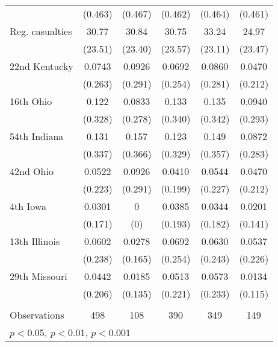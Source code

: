 {\begin{tabular}{lccccc}
 & (0.463) & (0.467) & (0.462) & (0.464) & (0.461) \\
Reg. casualties & 30.77 & 30.84 & 30.75 & 33.24\sym{***} & 24.97\sym{***} \\
 & (23.51) & (23.40) & (23.57) & (23.11) & (23.47) \\
22nd Kentucky & 0.0743 & 0.0926 & 0.0692 & 0.0860\sym{*} & 0.0470\sym{*} \\
 & (0.263) & (0.291) & (0.254) & (0.281) & (0.212) \\
16th Ohio & 0.122 & 0.0833 & 0.133 & 0.135 & 0.0940 \\
 & (0.328) & (0.278) & (0.340) & (0.342) & (0.293) \\
54th Indiana & 0.131 & 0.157 & 0.123 & 0.149\sym{**} & 0.0872\sym{**} \\
 & (0.337) & (0.366) & (0.329) & (0.357) & (0.283) \\
42nd Ohio & 0.0522 & 0.0926\sym{**} & 0.0410\sym{**} & 0.0544 & 0.0470 \\
 & (0.223) & (0.291) & (0.199) & (0.227) & (0.212) \\
4th Iowa & 0.0301\sym{***} & 0\sym{***} & 0.0385 & 0.0344 & 0.0201 \\
 & (0.171) & (0) & (0.193) & (0.182) & (0.141) \\
13th Illinois & 0.0602 & 0.0278\sym{**} & 0.0692\sym{**} & 0.0630 & 0.0537 \\
 & (0.238) & (0.165) & (0.254) & (0.243) & (0.226) \\
29th Missouri & 0.0442 & 0.0185 & 0.0513 & 0.0573\sym{***} & 0.0134\sym{***} \\
 & (0.206) & (0.135) & (0.221) & (0.233) & (0.115) \\
 &  &  &  &  &  \\
 Observations & 498 & 108 & 390 & 349 & 149 \\ \hline
 \multicolumn{6}{l}{\footnotesize \sym{*} \(p<0.05\), \sym{**} \(p<0.01\), \sym{***} \(p<0.001\)}\\
\end{tabular}
}